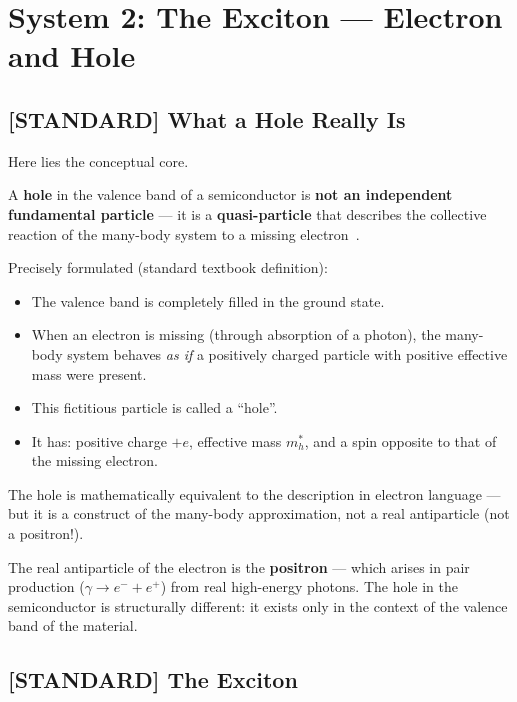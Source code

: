 \section{System 2: The Exciton --- Electron and Hole}
\label{sec:exciton}

\subsection{[STANDARD] What a Hole Really Is}

Here lies the conceptual core.

\begin{important}
A \textbf{hole} in the valence band of a semiconductor is
\textbf{not an independent fundamental particle} ---
it is a \textbf{quasi-particle} that describes the collective
reaction of the many-body system to a missing electron~\cite{Kittel2004,AshcroftMermin1976}.

Precisely formulated (standard textbook definition):
\begin{itemize}
  \item The valence band is completely filled in the ground state.
  \item When an electron is missing (through absorption of a photon),
    the many-body system behaves \emph{as if}
    a positively charged particle with positive effective mass
    were present.
  \item This fictitious particle is called a ``hole''.
  \item It has: positive charge $+e$, effective mass $m_h^*$,
    and a spin opposite to that of the missing electron.
\end{itemize}

The hole is mathematically equivalent to the description
in electron language --- but it is a construct of the
many-body approximation, not a real antiparticle
(not a positron!).
\end{important}

The real antiparticle of the electron is the \textbf{positron} ---
which arises in pair production ($\gamma \to e^- + e^+$)
from real high-energy photons. The hole in the semiconductor
is structurally different: it exists only in the context
of the valence band of the material.

\subsection{[STANDARD] The Exciton}

